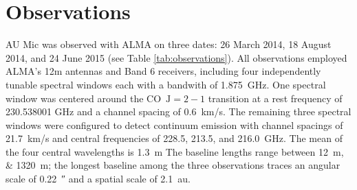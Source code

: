 \documentclass[modern]{aastex62}
\begin{document}
\section{Observations}
\label{section: observations}
AU Mic was observed  with ALMA on three dates: 26 March 2014, 18 August 2014, and 24 June 2015 (see Table \ref{tab:observations}).
All observations employed ALMA's 12m antennas and Band 6 receivers, including four independently tunable spectral windows each with a bandwith of \SI{1.875}{GHz}. 
One spectral window was centered around the CO~$\mathrm{J}=2-1$ transition at a rest frequency of 230.538001 GHz and a channel spacing of \SI{0.6}{km/s}.
The remaining three spectral windows were configured to detect continuum emission with channel spacings of \SI{21.7}{km/s} and central frequencies of 228.5, 213.5, and \SI{216.0}{GHz}.
The mean of the four central wavelengths is \SI{1.3}{m}
The baseline lengths range between \SIlist{12;1320}{m}; the longest baseline among the three observations traces an angular scale of \SI{0.22}{\arcsecond} and a spatial scale of \SI{2.1}{au}.
\end{document}
